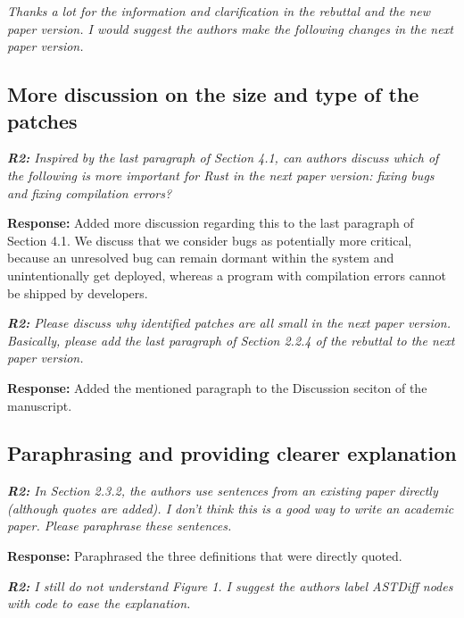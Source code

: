 \documentclass{article}
\begin{document}
\textit{Thanks a lot for the information and clarification in the rebuttal and the new paper version. I would suggest the authors make the following changes in the next paper version.}

\subsection{More discussion on the size and type of the patches}

\textit{\textbf{R2:} Inspired by the last paragraph of Section 4.1, can authors discuss which of the following is more important for Rust in the next paper version: fixing bugs and fixing compilation errors?}

\vspace*{1em} \noindent \textbf{Response:} Added more discussion regarding this to the last paragraph of Section 4.1. We discuss that we consider bugs as potentially more critical, because an unresolved bug can remain dormant within the system and unintentionally get deployed, whereas a program with compilation errors cannot be shipped by developers.

\vspace*{1em} \noindent \textit{\textbf{R2:} Please discuss why identified patches are all small in the next paper version. Basically, please add the last paragraph of Section 2.2.4 of the rebuttal to the next paper version.}

\vspace*{1em} \noindent \textbf{Response:} Added the mentioned paragraph to the Discussion seciton of the manuscript. 

\subsection{Paraphrasing and providing clearer explanation}

\textit{\textbf{R2:} In Section 2.3.2, the authors use sentences from an existing paper directly (although quotes are added). I don't think this is a good way to write an academic paper. Please paraphrase these sentences.}

\vspace*{1em} \noindent \textbf{Response:} Paraphrased the three definitions that were directly quoted.

\vspace*{1em} \noindent \textit{\textbf{R2: } I still do not understand Figure 1. I suggest the authors label ASTDiff nodes with code to ease the explanation.}
\end{document}

